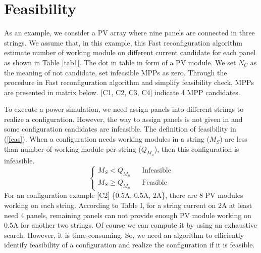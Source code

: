 \documentclass[conference]{IEEEtran}
\begin{document}
\section{Feasibility}\label{feasPro}
As an example, we consider a PV array where nine panels are connected in three strings. We assume that, in this example, this Fast reconfiguration algorithm estimate number of working module on different current candidate for each panel as shown in Table \ref{tab1}. The dot in table in form of a PV module. We set $N_C$ as the meaning of not candidate, set infeasible MPPs as zero. Through the procedure in Fast reconfiguration algorithm and simplify feasibility check, MPPs are presented in matrix below. [C1, C2, C3, C4] indicate 4 MPP candidates.


To execute a power simulation, we need assign panels into different strings to realize a configuration. However, the way to assign panels is not given in \cite{b10} and some configuration candidates are infeasible. 
The definition of feasibility in (\ref{feas}). When a configuration needs working modules in a string (\textit{$M_S$}) are less than number of working module per-string (\textit{$Q_{M_{n}}$}), then this configuration is infeasible. 
\begin{equation}
\left\{\begin{matrix}
M_S < Q_{M_{n}} & & \text{Infeasible}\\ 
M_S \geqslant Q_{M_{n}} & & \text{Feasible} 
\label{feas}
\end{matrix}\right. 
\end{equation}
For an configuration example [C2] \{0.5A, 0.5A, 2A\}, there are 8 PV modules working on each string. According to Table I, for a string current on 2A at least need 4 panels, remaining panels can not provide enough PV module working on 0.5A for another two strings. 
Of course we can compute it by using an exhaustive search. However, it is time-consuming. So, we need an algorithm to efficiently identify feasibility of a configuration and realize the configuration if it is feasible.


\end{document}
